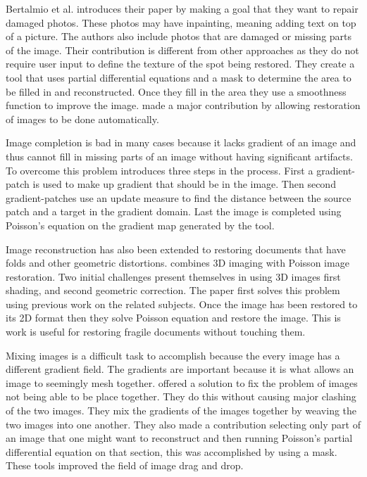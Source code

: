 \documentclass[10pt,twopage]{acmsiggraph}
\begin{document}
Bertalmio et al. introduces their paper by making a goal that they want to repair damaged photos. These photos may have inpainting, meaning adding text on top of a picture. The authors also include photos that are damaged or missing parts of the image. Their contribution is different from other approaches as they do not require user input to define the texture of the spot being restored. They create a tool that uses partial differential equations and a mask to determine the area to be filled in and reconstructed. Once they fill in the area they use a smoothness function to improve the image. \cite{Bertalmio} made a major contribution by allowing restoration of images to be done automatically.

Image completion is bad in many cases because it lacks gradient of an image and thus cannot fill in missing parts of an image without having significant artifacts. To overcome this problem \cite{Shen} introduces three steps in the process. First a gradient-patch is used to make up gradient that should be in the image. Then second gradient-patches use an update measure to find the distance between the source patch and a target in the gradient domain. Last the image is completed using Poisson's equation on the gradient map generated by the tool. 

Image reconstruction has also been extended to restoring documents that have folds and other geometric distortions. \cite{sun} combines 3D imaging with Poisson image restoration. Two initial challenges present themselves in using 3D images first shading, and second geometric correction. The paper first solves this problem using previous work on the related subjects. \cite{Ballester} Once the image has been restored to its 2D format then they solve Poisson equation and restore the image. This is work is useful for restoring fragile documents without touching them.

Mixing images is a difficult task to accomplish because the every image has a different gradient field. The gradients are important because it is what allows an image to seemingly mesh together. \cite{Perez} offered a solution to fix the problem of images not being able to be place together. They do this without causing major clashing of the two images. They mix the gradients of the images together by weaving the two images into one another. They also made a contribution selecting only part of an image that one might want to reconstruct and then running Poisson's partial differential equation on that section, this was accomplished by using a mask. These tools improved the field of image drag and drop.
\end{document}
